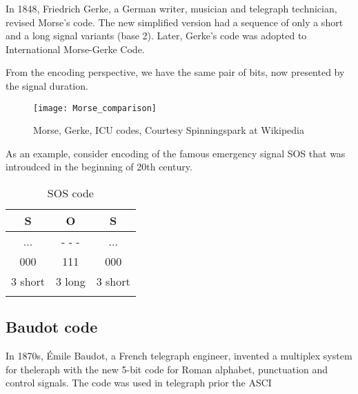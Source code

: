 In 1848, Friedrich Gerke, a German writer, musician and telegraph technician, revised Morse's code. The new simplified version had a sequence of only a short and a long signal variants (base 2). Later, Gerke's code was adopted to International Morse-Gerke Code.

From the encoding perspective, we have the same pair of bits, now presented by the signal duration.

\begin{figure}[h]
    \texttt{[image: Morse\_comparison]}
    \captionsetup{justification=centering,margin=1cm}
    \caption{Morse, Gerke, ICU codes, Courtesy Spinningspark at Wikipedia}
\end{figure}

As an example, consider encoding of the famous emergency signal SOS that was introudced in the beginning of 20th century.

\begin{longtable}[H]{ c | c | c }
    S & O & S \\
    \hline
    ... & - - - & ... \\
    \hline
    000 & 111 & 000 \\
    \hline
    3 short & 3 long & 3 short \\
    \hline
\caption{SOS code}
\end{longtable}


\subsection{Baudot code}

In 1870s, Émile Baudot, a French telegraph engineer, invented a multiplex system for theleraph with the new 5-bit code for Roman alphabet, punctuation and control signals. The code was used in telegraph prior the ASCI